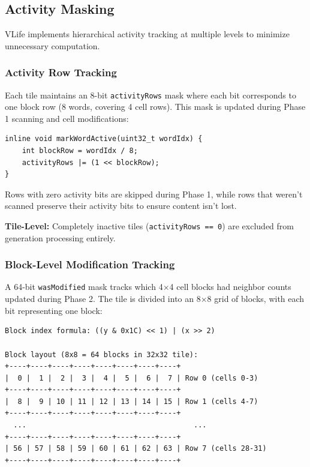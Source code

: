 \documentclass[11pt]{article}
\theoremstyle{definition}
\begin{document}
    \subsection{Activity Masking}

    VLife implements hierarchical activity tracking at multiple levels to minimize unnecessary computation.

    \subsubsection{Activity Row Tracking}

    Each tile maintains an 8-bit \texttt{activityRows} mask where each bit corresponds to one block row (8 words, covering 4 cell rows). This mask is updated during Phase 1 scanning and cell modifications:

    \begin{lstlisting}
inline void markWordActive(uint32_t wordIdx) {
    int blockRow = wordIdx / 8;
    activityRows |= (1 << blockRow);
}
    \end{lstlisting}

    Rows with zero activity bits are skipped during Phase 1, while rows that weren't scanned preserve their activity bits to ensure content isn't lost.

    \textbf{Tile-Level:} Completely inactive tiles (\texttt{activityRows == 0}) are excluded from generation processing entirely.

    \subsubsection{Block-Level Modification Tracking}

    A 64-bit \texttt{wasModified} mask tracks which 4$\times$4 cell blocks had neighbor counts updated during Phase 2. The tile is divided into an 8$\times$8 grid of blocks, with each bit representing one block:

    \begin{verbatim}
Block index formula: ((y & 0x1C) << 1) | (x >> 2)

Block layout (8x8 = 64 blocks in 32x32 tile):
+----+----+----+----+----+----+----+----+
|  0 |  1 |  2 |  3 |  4 |  5 |  6 |  7 | Row 0 (cells 0-3)
+----+----+----+----+----+----+----+----+
|  8 |  9 | 10 | 11 | 12 | 13 | 14 | 15 | Row 1 (cells 4-7)
+----+----+----+----+----+----+----+----+
  ...                                       ...
+----+----+----+----+----+----+----+----+
| 56 | 57 | 58 | 59 | 60 | 61 | 62 | 63 | Row 7 (cells 28-31)
+----+----+----+----+----+----+----+----+
    \end{verbatim}
\end{document}
